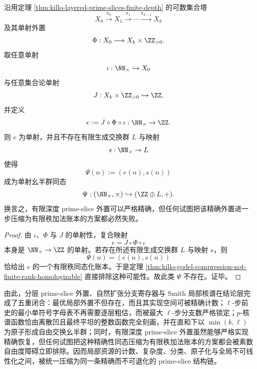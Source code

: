 \begin{theorem}\label{thm:conclusion-primeslice-finite-depth-ledger-incompatibility}
沿用定理 \ref{thm:killo-layered-prime-slices-finite-depth} 的可数集合塔
\[
X_0\xrightarrow{\pi_0}X_1\xrightarrow{\pi_1}\cdots\xrightarrow{\pi_{k-1}}X_k
\]
及其单射外置
\[
\Phi:X_0\longrightarrow X_k\times \ZZ_{>0}.
\]
取任意单射
\[
\iota:\NN_{\times}\hookrightarrow X_0
\]
与任意集合论单射
\[
J:X_k\times \ZZ_{>0}\hookrightarrow \ZZ,
\]
并定义
\[
e:=J\circ \Phi\circ \iota:\NN_{\times}\to \ZZ.
\]
则 \(e\) 为单射，并且不存在有限生成交换群 \(L\) 与映射
\[
s:\NN_{\times}\to L
\]
使得
\[
\Psi(n):=(e(n),s(n))
\]
成为单射幺半群同态
\[
\Psi:(\NN_{\times},\times)\hookrightarrow (\ZZ\oplus L,+).
\]
换言之，有限深度 prime-slice 外置可以严格精确，但任何试图把该精确外置进一步压缩为有限秩加法账本的方案都必然失败。
\end{theorem}
\begin{proof}
由 \(\iota\)、\(\Phi\) 与 \(J\) 的单射性，复合映射
\[
e=J\circ \Phi\circ \iota
\]
本身是 \(\NN_{\times}\to\ZZ\) 的单射。若存在所述有限生成交换群 \(L\) 与映射 \(s\)，则
\[
\Psi(n)=(e(n),s(n))
\]
恰给出 \(e\) 的一个有限秩同态化账本。于是定理 \ref{thm:killo-godel-compression-not-finite-rank-homologizable} 直接排除这种可能性。故此类 \(\Psi\) 不存在。证毕。
\end{proof}

\noindent
由此，分层 prime-slice 外置、自然扩张分支寄存器与 Smith 局部核谱在结论层完成了五重闭合：最优局部外置不但存在，而且其实现空间可被精确计数；\(\ell\)-步前史的最小单符号字母表不再需要逐层粗估，而被最大 \(\ell\)-步分支数严格锁定；\(p\)-核谱函数恰由离散凹且最终平坦的整数函数完全刻画，并在直和下以 \(\min(k,\ell)\) 为原子形成自由交换幺半群；同时，有限深度 prime-slice 外置虽然能够严格实现精确恢复，但任何试图把这种精确性同态压缩为有限秩加法账本的方案都会被素数自由度障碍立即排除。因而局部资源的计数、复杂度、分类、原子化与全局不可线性化之间，被统一压缩为同一条精确而不可退化的 prime-slice 结构链。

\endinput
